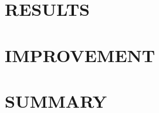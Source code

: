 \documentclass[apj, revtex4]{emulateapj}
\begin{document}



\section{RESULTS}

\section{IMPROVEMENT}
\section{SUMMARY}


\end{document}
